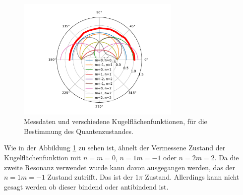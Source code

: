 \begin{figure}
    \centering
    \includegraphics[width = 0.7\textwidth, keepaspectratio]{figure/WMQZ.pdf}
    \caption{Messdaten und verschiedene Kugelflächenfunktionen, für die Bestimmung des Quantenzustandes.}
    \label{fig:WMQZ}
\end{figure}
\FloatBarrier
Wie in der Abbildung \ref{fig:WMQZ} zu sehen ist, ähnelt der Vermessene Zustand der Kugelflächenfunktion mit 
$n=m=0$, $n=1 m=-1$ oder $n=2 m=2$. Da die zweite Resonanz verwendet wurde kann davon ausgegangen werden, das der 
$n=1 m=-1$ Zustand zutrifft. Das ist der $1\pi$ Zustand. Allerdings kann nicht gesagt werden ob dieser bindend oder antibindend 
ist.